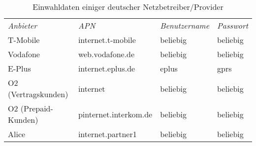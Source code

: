\begin{table}
\begin{tabular}{llll}
\emph{Anbieter}     &\emph{APN}            &\emph{Benutzername} &\emph{Passwort} \\
T-Mobile            &internet.t-mobile     &beliebig     &beliebig \\
Vodafone            &web.vodafone.de       &beliebig     &beliebig \\
E-Plus              &internet.eplus.de     &eplus        &gprs \\
O2 (Vertragskunden) &internet              &beliebig     &beliebig \\
O2 (Prepaid-Kunden) &pinternet.interkom.de &beliebig     &beliebig \\
Alice               &internet.partner1     &beliebig     &beliebig \\
\end{tabular}
\caption{Einwahldaten einiger deutscher Netzbetreiber/Provider}\label{umts:credentials}
\end{table}

